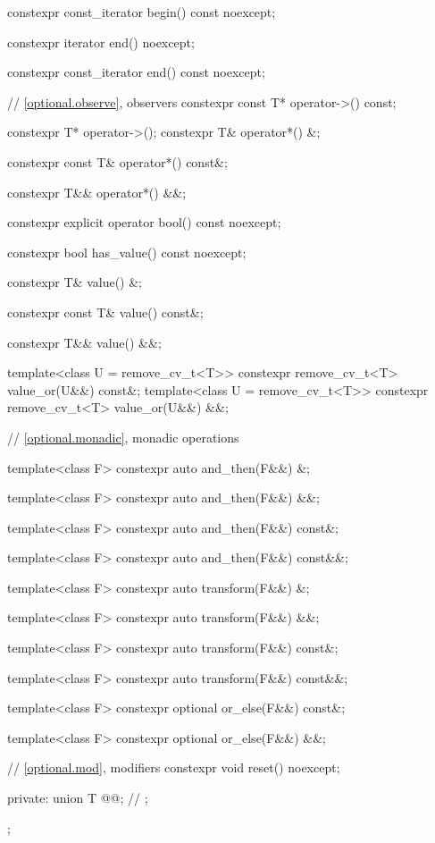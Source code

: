 \begin{codeblock}
{{    constexpr const_iterator begin() const noexcept;

    constexpr iterator end() noexcept;

    constexpr const_iterator end() const noexcept;

    // \ref{optional.observe}, observers
    constexpr const T* operator->() const;

    constexpr T* operator->();
    constexpr T& operator*() &;

    constexpr const T& operator*() const&;

    constexpr T&& operator*() &&;

    constexpr explicit operator bool() const noexcept;

    constexpr bool has_value() const noexcept;

    constexpr T& value() &;

    constexpr const T& value() const&;

    constexpr T&& value() &&;

    template<class U = remove_cv_t<T>> constexpr remove_cv_t<T> value_or(U&&) const&;
    template<class U = remove_cv_t<T>> constexpr remove_cv_t<T> value_or(U&&) &&;

    // \ref{optional.monadic}, monadic operations

    template<class F> constexpr auto and_then(F&&) &;

    template<class F> constexpr auto and_then(F&&) &&;

    template<class F> constexpr auto and_then(F&&) const&;

    template<class F> constexpr auto and_then(F&&) const&&;

    template<class F> constexpr auto transform(F&&) &;

    template<class F> constexpr auto transform(F&&) &&;

    template<class F> constexpr auto transform(F&&) const&;

    template<class F> constexpr auto transform(F&&) const&&;

    template<class F> constexpr optional or_else(F&&) const&;

    template<class F> constexpr optional or_else(F&&) &&;

    // \ref{optional.mod}, modifiers
    constexpr void reset() noexcept;

  private:
    union {
      T @@; // \expos
    };
  };
}
\end{codeblock}

